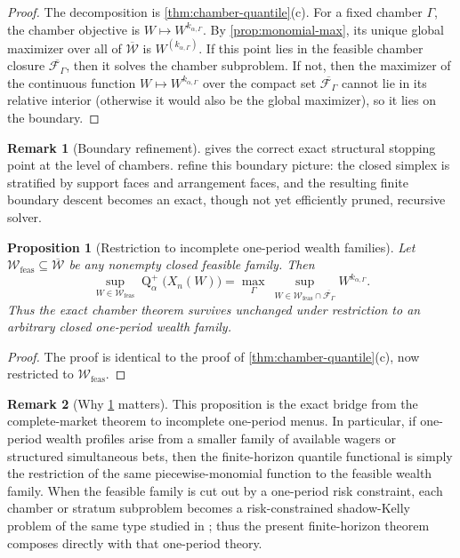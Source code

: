 \documentclass[11pt]{article}
\newtheorem{proposition}[proposition]{Proposition}
\theoremstyle{definition}
\newtheorem{remark}[remark]{Remark}
\newcommand{\1}{\mathbf{1}}
\newcommand{\Quant}{\operatorname{Q}}
\begin{document}
\begin{proof}
The decomposition is \cref{thm:chamber-quantile}(c). For a fixed chamber $\Gamma$, the chamber objective is $W\mapsto W^{k_{\alpha,\Gamma}}$. By \cref{prop:monomial-max}, its unique global maximizer over all of $\overline{\mathcal W}$ is $W^{(k_{\alpha,\Gamma})}$. If this point lies in the feasible chamber closure $\overline{\mathcal F_\Gamma}$, then it solves the chamber subproblem. If not, then the maximizer of the continuous function $W\mapsto W^{k_{\alpha,\Gamma}}$ over the compact set $\overline{\mathcal F_\Gamma}$ cannot lie in its relative interior (otherwise it would also be the global maximizer), so it lies on the boundary.
\end{proof}

\begin{remark}[Boundary refinement]
 gives the correct exact structural stopping point at the level of chambers.  refine this boundary picture: the closed simplex is stratified by support faces and arrangement faces, and the resulting finite boundary descent becomes an exact, though not yet efficiently pruned, recursive solver.
\end{remark}

\begin{proposition}[Restriction to incomplete one-period wealth families]\label{prop:restricted-family}
Let $\mathcal W_{\mathrm{feas}}\subseteq\overline{\mathcal W}$ be any nonempty closed feasible family. Then
\[
\sup_{W\in\mathcal W_{\mathrm{feas}}} \Quant_\alpha^+\bigl(X_n(W)\bigr)
=
\max_{\Gamma}\ \sup_{W\in\mathcal W_{\mathrm{feas}}\cap\overline{\mathcal F_\Gamma}} W^{k_{\alpha,\Gamma}}.
\]
Thus the exact chamber theorem survives unchanged under restriction to an arbitrary closed one-period wealth family.
\end{proposition}

\begin{proof}
The proof is identical to the proof of \cref{thm:chamber-quantile}(c), now restricted to $\mathcal W_{\mathrm{feas}}$.
\end{proof}

\begin{remark}[Why \cref{prop:restricted-family} matters]
This proposition is the exact bridge from the complete-market theorem to incomplete one-period menus. In particular, if one-period wealth profiles arise from a smaller family of available wagers or structured simultaneous bets, then the finite-horizon quantile functional is simply the restriction of the same piecewise-monomial function to the feasible wealth family. When the feasible family is cut out by a one-period risk constraint, each chamber or stratum subproblem becomes a risk-constrained shadow-Kelly problem of the same type studied in \cite{Long2026Risk}; thus the present finite-horizon theorem composes directly with that one-period theory.
\end{remark}
\end{document}
